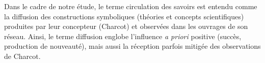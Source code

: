 Dans le cadre de notre étude, le terme \og{}circulation des savoirs\fg{} est entendu comme la diffusion des constructions symboliques (théories et concepts scientifiques) produites par leur concepteur (Charcot) et observées dans les ouvrages de son réseau. Ainsi, le terme \og{}diffusion\fg{} englobe l'influence \textit{a priori} positive (\og{}succès\fg{}, \og{}production de nouveauté\fg{}), mais aussi la réception parfois mitigée des observations de Charcot.

%
